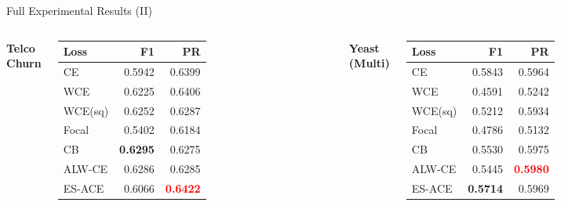 \documentclass[aspectratio=169]{beamer}
\renewcommand{\textbf}[1]{\textcolor{SejongBlue}{\sf\bfseries #1}}
\begin{document}
\begin{frame}{Full Experimental Results (II)}
\scriptsize
\renewcommand{\arraystretch}{0.85}

\begin{columns}[T, totalwidth=\textwidth]


\textbf{Telco Churn}
\begin{tabular}{lrr}
\toprule
Loss & F1 & PR \\
\midrule
CE & 0.5942 & 0.6399 \\
WCE & 0.6225 & 0.6406 \\
WCE(sq) & 0.6252 & 0.6287 \\
Focal & 0.5402 & 0.6184 \\
CB & \textcolor{SejongBlue}{\textbf{0.6295}} & 0.6275 \\
\textcolor{SejongBlue}{ALW-CE} & 0.6286 & 0.6285 \\
\textcolor{SejongBlue}{ES-ACE} & 0.6066 & \textcolor{red}{\textbf{0.6422}} \\
\bottomrule
\end{tabular}

\vspace{0.8em}

\textbf{Yeast (Multi)}
\begin{tabular}{lrr}
\toprule
Loss & F1 & PR \\
\midrule
CE & 0.5843 & 0.5964 \\
WCE & 0.4591 & 0.5242 \\
WCE(sq) & 0.5212 & 0.5934 \\
Focal & 0.4786 & 0.5132 \\
CB & 0.5530 & 0.5975 \\
\textcolor{SejongBlue}{ALW-CE} & 0.5445 & \textcolor{red}{\textbf{0.5980}} \\
\textcolor{SejongBlue}{ES-ACE} & \textcolor{SejongBlue}{\textbf{0.5714}} & 0.5969 \\
\bottomrule
\end{tabular}



\end{columns}
\end{frame}
\end{document}
